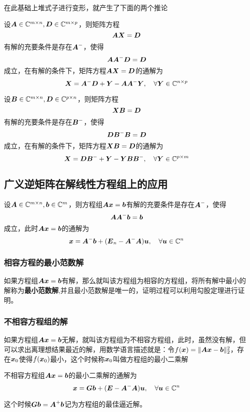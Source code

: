 \documentclass[12pt, a4paper, oneside, UTF8]{ctexbook}
\begin{document}
在此基础上堆式子进行变形，就产生了下面的两个推论
\begin{corollary}{}{}
    设$\A\in\C^{m\times n}, \D\in\C^{m\times p}$，则矩阵方程\[\A\X=\D\]有解的充要条件是存在$\A^-$，使得\[\A\A^-\D=\D\]成立，在有解的条件下，矩阵方程$\A\X=\D$的通解为\[\X=\A^-\D+\Y-\A\A^-\Y,\ \ \ \forall\Y\in\C^{n\times p}\]
\end{corollary}
\begin{corollary}{}{}
    设$\B\in\C^{m\times n}, \D\in\C^{p\times n}$，则矩阵方程\[\X\B=\D\]有解的充要条件是存在$\B^-$，使得\[\D\B^-\B=\D\]成立，在有解的条件下，矩阵方程$\X\B=\D$的通解为\[\X=\D\B^-+\Y-\Y\B\B^-,\ \ \ \forall\Y\in\C^{p\times m}\]
\end{corollary}

\subsection{广义逆矩阵在解线性方程组上的应用}
\begin{corollary}{}{}
    设$\A\in\C^{m\times n}, \b\in\C^m$，则方程组$\A\x=\b$有解的充要条件是存在$\A^-$，使得\[\A\A^-\b=\b\]成立，此时$\A\x=\b$的通解为\[\x=\A^-\b+(\bs{E}_n-\A^-\A)\u,\ \ \ \forall\u\in\C^n\]
\end{corollary}

\subsubsection{相容方程的最小范数解}
如果方程组$\A\x=\b$有解，那么就叫该方程组为相容的方程组，将所有解中最小的解称为\textbf{最小范数解},并且最小范数解是唯一的，证明过程可以利用勾股定理进行证明。
\subsubsection{不相容方程组的解}
如果方程组$\A\x=\b$无解，就叫该方程组为不相容方程组，此时，虽然没有解，但可以求出离理想结果最近的解，用数学语言描述就是：令$f(\x)=\Vert\A\x-\b\Vert_2^2$，存在$\x_0$使得$f(\x_0)$最小，这个时候称$\x_0$叫做方程组的最小二乘解

不相容方程组$\A\x=\b$的最小二乘解的通解为\[\x=\G\b+(\bs{E}-\A^-\A)\u,\ \ \ \forall\u\in\C^n\]

这个时候$\G\b=\A^+\b$记为方程组的最佳逼近解。
\ifx\allfiles\undefined
\end{document}
